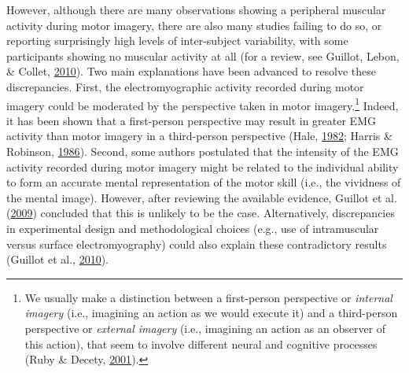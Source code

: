 \documentclass[a4paper,12pt,twoside,onecolumn,openright,final,oldfontcommands]{memoir}
\let\rmarkdownfootnote\footnote%
\def\footnote{\protect\rmarkdownfootnote}
\begin{document}
However, although there are many observations showing a peripheral muscular activity during motor imagery, there are also many studies failing to do so, or reporting surprisingly high levels of inter-subject variability, with some participants showing no muscular activity at all (for a review, see Guillot, Lebon, \& Collet, \protect\hyperlink{ref-guillot_electromyographic_2010}{2010}). Two main explanations have been advanced to resolve these discrepancies. First, the electromyographic activity recorded during motor imagery could be moderated by the perspective taken in motor imagery.\footnote{We usually make a distinction between a first-person perspective or \emph{internal imagery} (i.e., imagining an action as we would execute it) and a third-person perspective or \emph{external imagery} (i.e., imagining an action as an observer of this action), that seem to involve different neural and cognitive processes (Ruby \& Decety, \protect\hyperlink{ref-ruby_effect_2001}{2001}).} Indeed, it has been shown that a first-person perspective may result in greater EMG activity than motor imagery in a third-person perspective (Hale, \protect\hyperlink{ref-hale_effects_1982}{1982}; Harris \& Robinson, \protect\hyperlink{ref-harris_effects_1986}{1986}). Second, some authors postulated that the intensity of the EMG activity recorded during motor imagery might be related to the individual ability to form an accurate mental representation of the motor skill (i.e., the vividness of the mental image). However, after reviewing the available evidence, Guillot et al. (\protect\hyperlink{ref-guillot_brain_2009}{2009}) concluded that this is unlikely to be the case. Alternatively, discrepancies in experimental design and methodological choices (e.g., use of intramuscular versus surface electromyography) could also explain these contradictory results (Guillot et al., \protect\hyperlink{ref-guillot_electromyographic_2010}{2010}).

\vspace{2mm}
\end{document}
